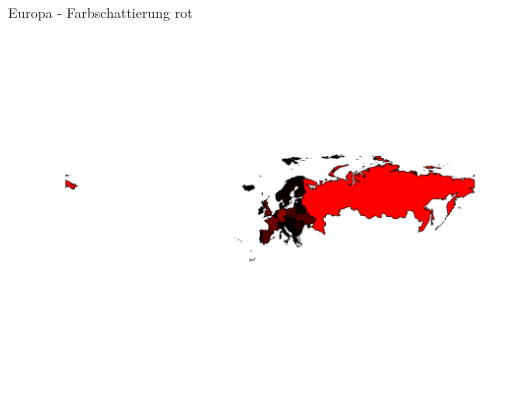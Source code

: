 \documentclass[ignorenonframetext,]{beamer}
\newenvironment{Shaded}{\begin{snugshade}}{\end{snugshade}}
\newcommand{\DataTypeTok}[1]{\textcolor[rgb]{0.74,0.68,0.62}{\underline{#1}}}
\newcommand{\DecValTok}[1]{\textcolor[rgb]{0.27,0.67,0.26}{#1}}
\newcommand{\KeywordTok}[1]{\textcolor[rgb]{0.26,0.66,0.93}{\textbf{#1}}}
\newcommand{\NormalTok}[1]{\textcolor[rgb]{0.74,0.68,0.62}{#1}}
\newcommand{\OperatorTok}[1]{\textcolor[rgb]{0.74,0.68,0.62}{#1}}
\newcommand{\StringTok}[1]{\textcolor[rgb]{0.02,0.61,0.04}{#1}}
\begin{document}
\begin{frame}[fragile]{Europa - Farbschattierung rot}
\protect\hypertarget{europa---farbschattierung-rot}{}

\begin{Shaded}
\end{Shaded}

\includegraphics{Geomedizin_files/figure-beamer/unnamed-chunk-80-1.pdf}

\end{frame}
\end{document}
